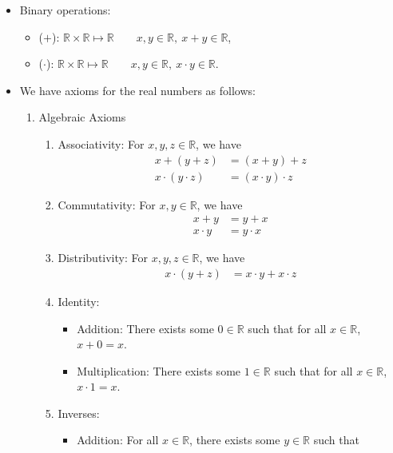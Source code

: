 \documentclass{article}
\newcommand{\R}{\mathbb{R}}
\newcommand{\?}{\stackrel{?}{=}}
\newcommand{\smallblacksquare}{\rule{0.5em}{0.5em}}
\begin{document}
\begin{itemize}
    \item Binary operations:
    \begin{itemize}[label=$\smallblacksquare$]
        \item ($+$): $\R \times \R \mapsto \R \qquad x, y \in \R, \ x + y \in \R$,
        \item ($\cdot$): $\R \times \R \mapsto \R \qquad x, y \in \R, \ x \cdot y \in \R$.
    \end{itemize}
    \item We have axioms for the real numbers as follows:
    \begin{enumerate}[label=\Roman*]
        \item Algebraic Axioms
        \begin{enumerate}[label=(\roman*)]
            \item Associativity: For $x, y, z \in \R$, we have
            \begin{align*}
                x + (y + z) &= (x + y) + z \\
                x \cdot (y \cdot z) &= (x \cdot y) \cdot z
            \end{align*}
            \item Commutativity: For $x, y \in \R$, we have
            \begin{align*}
                x + y &= y + x \\
                x \cdot y &= y \cdot x
            \end{align*}
            \item Distributivity: For $x, y, z \in \R$, we have
            \begin{align*}
                x \cdot (y + z) &= x \cdot y + x \cdot z
            \end{align*}
            \item Identity:
            \begin{itemize}[label=$\smallblacksquare$]
                \item Addition: There exists some $0 \in \R$ such that for all $x \in \R$, $x + 0 = x$.
                \item Multiplication: There exists some $1 \in \R$ such that for all $x \in \R$, $x \cdot 1 = x$.
            \end{itemize} 
            \item Inverses:
            \begin{itemize}[label=$\smallblacksquare$]
                \item Addition: For all $x \in \R$, there exists some $y \in \R$ such that

\end{itemize}
\end{enumerate}
\end{enumerate}
\end{itemize}
\end{document}
